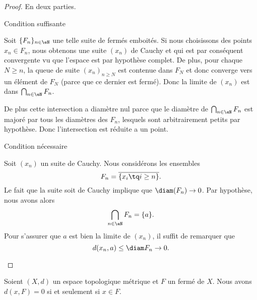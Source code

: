 \begin{proof}
    En deux parties.
    \begin{subproof}
    \item[Condition suffisante]

        Soit \( \{ F_n \}_{n\in \eN}\) une telle suite de fermés emboités. Si nous choisissons des points \( x_n\in F_n\), nous obtenons une suite \( (x_n)\) de Cauchy et qui est par conséquent convergente vu que l'espace est par hypothèse complet. De plus, pour chaque \( N\geq n\), la queue de suite \( (x_n)_{n\geq N}\) est contenue dans \( F_N\) et donc converge vers un élément de \( F_N\) (parce que ce dernier est fermé). Donc la limite de \( (x_n)\) est dans \( \bigcap_{n\in \eN}F_n\).

        De plus cette intersection a diamètre nul parce que le diamètre de \( \bigcap_{n\in \eN}F_n\) est majoré par tous les diamètres des \( F_n\), lesquels sont arbitrairement petits par hypothèse. Donc l'intersection est réduite a un point.

    \item[Condition nécessaire]

        Soit \( (x_n)\) un suite de Cauchy. Nous considérons les ensembles
        \begin{equation}
            F_n=\overline{ \{ x_i\tq i\geq n \} }.
        \end{equation}
        Le fait que la suite soit de Cauchy implique que \( \diam(F_n)\to 0\). Par hypothèse, nous avons alors
        \begin{equation}
            \bigcap_{n\in \eN}F_n=\{ a \}.
        \end{equation}
        Pour s'assurer que \( a\) est bien la limite de \( (x_n)\), il suffit de remarquer que
        \begin{equation}
            d(x_n,a)\leq \diam F_n\to 0.
        \end{equation}
    \end{subproof}
\end{proof}

\begin{proposition}     \label{PropGULUooNzqZKj}
    Soient \( (X,d) \) un espace topologique métrique et \( F\) un fermé de \( X\). Nous avons \( d(x,F)=0\) si et seulement si \( x\in F\).
\end{proposition}

